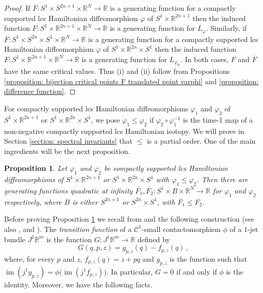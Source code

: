 \documentclass{amsart}
\DeclareMathOperator{\im}{im}
\newtheorem{prop}[thm]{Proposition}
\theoremstyle{remark}
\begin{document}
\begin{proof}
If $\overline{F}: S^1 \times S^{2n+1} \times \mathbb{R}^N \rightarrow \mathbb{R}$
is a generating function for a compactly supported
lcs Hamiltonian diffeomorphism $\varphi$ of $S^1 \times \mathbb{R}^{2n+1}$
then the induced function
$F: S^1 \times \mathbb{R}^{2n+1} \times \mathbb{R}^N \rightarrow \mathbb{R}$
is a generating function for $L_{\varphi}$.
Similarly,
if $\overline{F}: S^1 \times S^{2n} \times S^1 \times \mathbb{R}^N \rightarrow \mathbb{R}$
is a generating function for a compactly supported
lcs Hamiltonian diffeomorphism $\varphi$ of $S^1 \times \mathbb{R}^{2n} \times S^1$
then the induced function
$F: S^1 \times \mathbb{R}^{2n+1} \times \mathbb{R}^N \rightarrow \mathbb{R}$
is a generating function for $L_{\varphi_{\mathbb{R}}}$.
In both cases,
$F$ and $\overline{F}$ have the same critical values.
Thus (i) and (ii) follow
from Propositions \ref{proposition: bijection critical points F translated point varphi}
and \ref{proposition: difference function}.
\end{proof}

For compactly supported lcs Hamiltonian diffeomorphisms $\varphi_1$ and $\varphi_2$
of $S^1 \times \mathbb{R}^{2n+1}$ or $S^1 \times \mathbb{R}^{2n} \times S^1$,
we pose $\varphi_1 \leq \varphi_2$
if $\varphi_2 \circ \varphi_1^{-1}$ is the time-1 map
of a non-negative compactly supported lcs Hamiltonian isotopy.
We will prove in Section \ref{section: spectral invariants}
that $\leq$ is a partial order.
One of the main ingredients
will be the next proposition.

\begin{prop}\label{proposition: partial order and gf}
Let $\varphi_1$ and $\varphi_2$
be compactly supported lcs Hamiltonian diffeomorphisms
of $S^1 \times \mathbb{R}^{2n+1}$ or $S^1 \times \mathbb{R}^{2n} \times S^1$
with $\varphi_1 \leq \varphi_2$.
Then there are
generating functions quadratic at infinity
$\overline{F_1}, \overline{F_2}: S^1 \times B \times \mathbb{R}^N \rightarrow \mathbb{R}$
for $\varphi_1$ and $\varphi_2$ respectively,
where $B$ is either $S^{2n+1}$ or $S^{2n} \times S^1$,
with $\overline{F_1} \leq \overline{F_2}$.
\end{prop}

Before proving Proposition \ref{proposition: partial order and gf}
we recall from \cite[Theorem 3]{Chaperon}
and \cite[Section III.2]{Theret_thesis}
the following construction
(see also \cite[Proposition 3.4]{San11},
\cite[Proposition 3.4]{Giroux}
and \cite[Lemma 2.10]{FSZ}).
The \textit{transition function}
of a $\mathcal{C}^1$-small contactomorphism $\phi$
of a $1$-jet bundle $J^1 \mathbb{R}^m$
is the function $G: J^1 \mathbb{R}^m \rightarrow \mathbb{R}$
defined  by
\[
G (q, p, z) = g_{p, z} (q) - f_{p, z} (q) \,,
\]
where, for every $p$ and $z$,
$f_{p, z} (q) = z + pq$
and $g_{p, z}$ is the function such that
$\im (j^1 g_{p, z}) = \phi \big( \im (j^1 f_{p, z}) \big)$.
In particular,
$G = 0$ if and only if $\phi$ is the identity.
Moreover,
we have the following facts.
\end{document}

